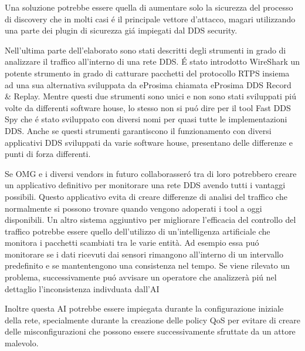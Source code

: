 Una soluzione potrebbe essere quella di aumentare solo la sicurezza del 
processo di discovery che in molti casi é il 
principale vettore d'attacco, magari 
utilizzando una parte dei plugin di sicurezza giá impiegati dal DDS security.

Nell'ultima parte dell'elaborato sono stati descritti degli strumenti 
in grado di analizzare il traffico all'interno di una rete DDS.
É stato introdotto WireShark un potente strumento in grado di 
catturare pacchetti del protocollo RTPS insiema ad una sua alternativa
sviluppata da eProsima chiamata eProsima DDS Record \&
Replay. Mentre questi due strumenti sono unici e non sono stati 
sviluppati piú volte da differenti software house, lo stesso non 
si puó dire per il tool Fast DDS Spy che é stato sviluppato 
con diversi nomi per quasi tutte le implementazioni DDS. 
Anche se questi strumenti garantiscono il funzionamento 
con diversi applicativi DDS sviluppati da varie software house, 
presentano delle differenze e punti di forza differenti. 

Se OMG e i diversi vendors in futuro collaborasseró tra di loro 
potrebbero creare un applicativo definitivo per monitorare 
una rete DDS avendo tutti i vantaggi possibili. Questo applicativo 
evita di creare differenze di analisi del traffico che normalmente 
si possono trovare quando vengono adoperati i tool a oggi 
disponibili.
Un altro sistema aggiuntivo per migliorare l'efficacia del 
controllo del traffico potrebbe essere quello 
dell'utilizzo di un'intelligenza artificiale che monitora 
i pacchetti scambiati tra le varie entità. 
Ad esempio essa puó monitorare se i dati ricevuti dai sensori 
rimangono all'interno di un intervallo predefinito e se 
mantentengono una consistenza nel tempo. Se viene rilevato 
un problema, successivamente puó avvisare un operatore che 
analizzerà piú nel dettaglio l'inconsistenza indivduata 
dall'AI

Inoltre questa AI potrebbe 
essere impiegata durante la configurazione iniziale della rete,
specialmente durante la creazione delle policy QoS per evitare
di creare delle misconfigurazioni che possono essere
successivamente sfruttate da un attore malevolo.


